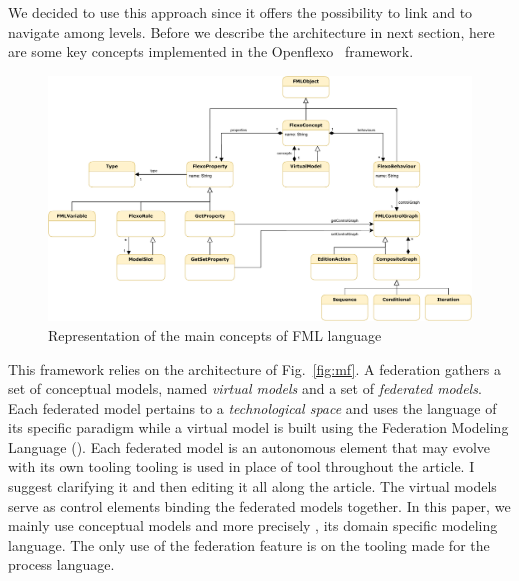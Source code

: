 We decided to use this approach since it offers the possibility to
link and to navigate among levels. Before we describe the 
architecture in next section, here are some key concepts implemented
in the Openflexo~\parencite{openflexo_link} framework.



\begin{figure}
    \centering
    \includegraphics[width=1.0 \textwidth]{Figures/FMLMetaModel-1.5.pdf}
    \caption{Representation of the main concepts of {FML} language}
    \label{fig:mm}
\end{figure}

This framework relies on the architecture of Fig.~\ref{fig:mf}. A federation
gathers a set of conceptual models, named \emph{virtual models} and a
set of \emph{federated models}. Each federated model pertains to a
\emph{technological space} and uses the language of its specific
paradigm while a virtual model is built using the Federation Modeling
Language (\FML). Each federated model is an autonomous
element that may evolve with its own tooling {\color{red} tooling is used in place of tool throughout the article.  I suggest clarifying it and then editing it all along the article}. The virtual models
serve as control elements binding the federated models together.
In this paper, we mainly use conceptual models and more precisely \FML, its
domain specific modeling language. The only use of the federation feature is on the tooling made for the process language.

